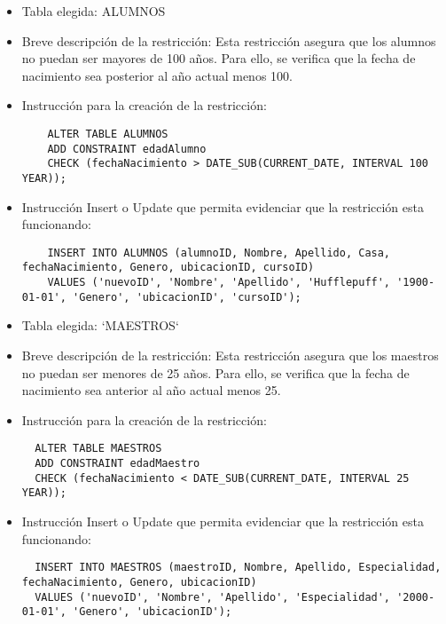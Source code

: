 \begin{itemize}
    \item Tabla elegida: ALUMNOS
    \item Breve descripción de la restricción: Esta restricción asegura que los alumnos no puedan ser mayores de 100 años. Para ello, se verifica que la fecha de nacimiento sea posterior al año actual menos 100.
    \item Instrucción para la creación de la restricción:
    \begin{verbatim}
    ALTER TABLE ALUMNOS
    ADD CONSTRAINT edadAlumno
    CHECK (fechaNacimiento > DATE_SUB(CURRENT_DATE, INTERVAL 100 YEAR));
    \end{verbatim}
    \item Instrucción Insert o Update que permita evidenciar que la restricción esta funcionando:
    \begin{verbatim}
    INSERT INTO ALUMNOS (alumnoID, Nombre, Apellido, Casa, fechaNacimiento, Genero, ubicacionID, cursoID)
    VALUES ('nuevoID', 'Nombre', 'Apellido', 'Hufflepuff', '1900-01-01', 'Genero', 'ubicacionID', 'cursoID');
    \end{verbatim}  
\end{itemize}


\begin{itemize}
  \item Tabla elegida: `MAESTROS`
  \item Breve descripción de la restricción: Esta restricción asegura que los maestros no puedan ser menores de 25 años. Para ello, se verifica que la fecha de nacimiento sea anterior al año actual menos 25.
  \item Instrucción para la creación de la restricción:
  \begin{verbatim}
  ALTER TABLE MAESTROS
  ADD CONSTRAINT edadMaestro
  CHECK (fechaNacimiento < DATE_SUB(CURRENT_DATE, INTERVAL 25 YEAR));
  \end{verbatim}
  \item Instrucción Insert o Update que permita evidenciar que la restricción esta funcionando:
  \begin{verbatim}
  INSERT INTO MAESTROS (maestroID, Nombre, Apellido, Especialidad, fechaNacimiento, Genero, ubicacionID)
  VALUES ('nuevoID', 'Nombre', 'Apellido', 'Especialidad', '2000-01-01', 'Genero', 'ubicacionID');
  \end{verbatim}
\end{itemize}

